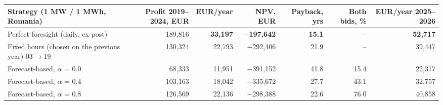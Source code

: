 \begin{tabular}{lrrrrrr}
\toprule
Strategy (1 MW / 1 MWh, Romania) & Profit 2019--2024, EUR & EUR/year & NPV, EUR & Payback, yrs & Both bids, \% & EUR/year 2025--2026 \\
\midrule
Perfect foresight (daily, ex post) & 189,816 & \textbf{33,197} & \textbf{$-$197,642} & \textbf{15.1} & -- & \textbf{52,717} \\
Fixed hours (chosen on the previous year) 03$\rightarrow$19 & 130,324 & 22,793 & $-$292,406 & 21.9 & -- & 39,447 \\
Forecast-based, $\alpha$ = 0.0 & 68,333 & 11,951 & $-$391,152 & 41.8 & 15.4 & 22,317 \\
Forecast-based, $\alpha$ = 0.4 & 103,163 & 18,042 & $-$335,672 & 27.7 & 43.1 & 32,757 \\
Forecast-based, $\alpha$ = 0.8 & 126,569 & 22,136 & $-$298,388 & 22.6 & 76.0 & 40,858 \\
\bottomrule
\end{tabular}
